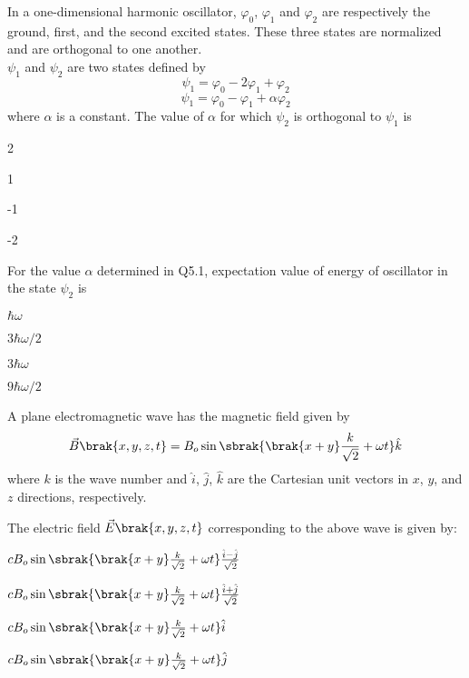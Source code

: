 \iffalse
  \author{EE24BTECH11007}
  \section{ph}
  \chapter{2011}
\fi
\item In a one-dimensional harmonic oscillator, $\varphi_0$, $\varphi_1$ and $\varphi_2$ are respectively the ground, first, and the second excited states. These three states are normalized and are orthogonal to one another.\\
$\psi_1$ and $\psi_2$ are two states defined by
$$\psi_1=\varphi_0-2\varphi_1+\varphi_2$$
$$\psi_1=\varphi_0-\varphi_1+\alpha\varphi_2$$
where $\alpha$ is a constant.
The value of $\alpha$ for which $\psi_2$ is orthogonal to $\psi_1$ is 
\begin{enumerate}
\begin{multicols}{4}
\item 2
\item 1
\item -1
\item -2
\end{multicols}
\end{enumerate}
\item For the value $\alpha$ determined in Q5.1, expectation value of energy of oscillator in the state $\psi_2$ is
\begin{enumerate}
\begin{multicols}{4}
\item $\hbar\omega$
\item $3\hbar\omega/2$
\item $3\hbar\omega$
\item $9\hbar\omega/2$
\end{multicols}
\end{enumerate}
A plane electromagnetic wave has the magnetic field given by
$$\vec{B}\brak{x,y,z,t}=B_o\sin\sbrak{\brak{x+y}\frac{k}{\sqrt{2}}+\omega t}\hat{k}$$
where $k$ is the wave number and $\hat{i}$, $\hat{j}$, $\hat{k}$ are the Cartesian unit vectors in $x$, $y$, and $z$ directions, respectively.
\item The electric field $\vec{E}\brak{x,y,z,t}$ corresponding to the above wave is given by:
\begin{enumerate}
\begin{multicols}{2}
\item $cB_o\sin\sbrak{\brak{x+y}\frac{k}{\sqrt{2}}+\omega t}\frac{\hat{i}-\hat{j}}{\sqrt{2}}$
\item $cB_o\sin\sbrak{\brak{x+y}\frac{k}{\sqrt{2}}+\omega t}\frac{\hat{i}+\hat{j}}{\sqrt{2}}$
\item $cB_o\sin\sbrak{\brak{x+y}\frac{k}{\sqrt{2}}+\omega t}\hat{i}$
\item $cB_o\sin\sbrak{\brak{x+y}\frac{k}{\sqrt{2}}+\omega t}\hat{j}$
\end{multicols}
\end{enumerate}
